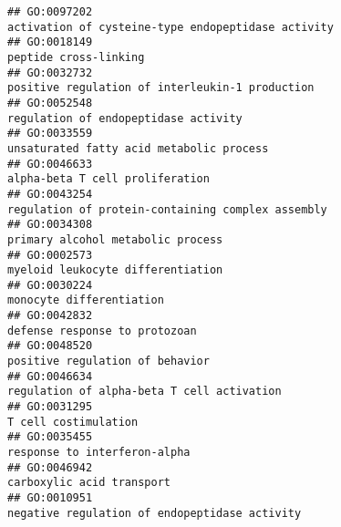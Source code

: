 \documentclass[
]{article}
\begin{document}
\begin{verbatim}
## GO:0097202                                                                                               activation of cysteine-type endopeptidase activity
## GO:0018149                                                                                                                            peptide cross-linking
## GO:0032732                                                                                                  positive regulation of interleukin-1 production
## GO:0052548                                                                                                             regulation of endopeptidase activity
## GO:0033559                                                                                                         unsaturated fatty acid metabolic process
## GO:0046633                                                                                                                  alpha-beta T cell proliferation
## GO:0043254                                                                                                regulation of protein-containing complex assembly
## GO:0034308                                                                                                                primary alcohol metabolic process
## GO:0002573                                                                                                                myeloid leukocyte differentiation
## GO:0030224                                                                                                                         monocyte differentiation
## GO:0042832                                                                                                                    defense response to protozoan
## GO:0048520                                                                                                                  positive regulation of behavior
## GO:0046634                                                                                                       regulation of alpha-beta T cell activation
## GO:0031295                                                                                                                             T cell costimulation
## GO:0035455                                                                                                                     response to interferon-alpha
## GO:0046942                                                                                                                        carboxylic acid transport
## GO:0010951                                                                                                    negative regulation of endopeptidase activity

\end{verbatim}
\end{document}
